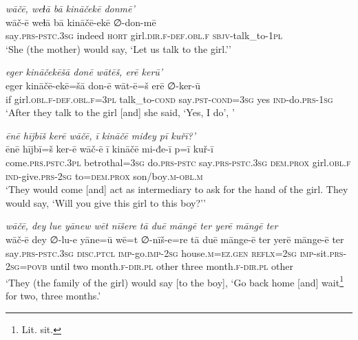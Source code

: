 \ea \label{ŽE.76}
\textit{wāčē, weɫā bā kināčekē donmē’} \\ 
\gll wāč-ē weɫā bā kināčē-ekē ∅-don-mē \\ 
 say\textsc{.prs-pstc}\textsc{.3sg} indeed \textsc{hort} girl\textsc{.dir}\textsc{.f}\textsc{-def}\textsc{.obl}\textsc{.f} \textsc{sbjv-}talk\_to\textsc{-1pl} \\ 
\glt `She (the mother) would say, ‘Let us talk to the girl.’'
\z 
 
\ea \label{ŽE.77}
\textit{eger kināčekēšā donē wātēš, erē kerū’} \\ 
\gll eger kināčē-ekē=šā don-ē wāt-ē=š erē ∅-ker-ū \\ 
 if girl\textsc{.obl}\textsc{.f}\textsc{-def}\textsc{.obl}\textsc{.f}\textsc{=3pl} talk\_to\textsc{-cond} say\textsc{.pst}\textsc{-cond}\textsc{=3sg} yes \textsc{ind-}do\textsc{.prs}\textsc{-\textsc{1sg}} \\ 
\glt `After they talk to the girl [and] she said, ‘Yes, I do’, '
\z 
 
\ea \label{ŽE.80}
\textit{ēnē hījbīš kerē wāčē, ī kināčē miđey pī kuřī?’} \\ 
\gll ēnē hījbī=š ker-ē wāč-ē ī kināčē mi-đe-ī p=ī kuř-ī \\ 
 come\textsc{.prs}\textsc{.pstc}\textsc{.3pl} betrothal\textsc{=3sg} do\textsc{.prs}\textsc{-pstc} say\textsc{.prs-pstc}\textsc{.3sg} \textsc{dem.prox} girl\textsc{.obl}\textsc{.f} \textsc{ind-}give\textsc{.prs}-\textsc{2sg} to=\textsc{dem.prox} son/boy\textsc{.m}\textsc{-obl}\textsc{.m} \\ 
\glt `They would come [and] act as intermediary to ask for the hand of the girl. They would say, ‘Will you give this girl to this boy?’'
\z 
 
\ea \label{ŽE.82}
\textit{wāčē, dey lue yānew wēt nīšere tā duē māngē ter yerē māngē ter} \\ 
\gll wāč-ē dey ∅-lu-e yāne=ū wē=t ∅-nīš-e=re tā duē mānge-ē ter yerē mānge-ē ter \\ 
 say\textsc{.prs-pstc}\textsc{.3sg} \textsc{disc}.\textsc{ptcl} \textsc{imp-}go.\textsc{imp-}\textsc{2sg} house\textsc{.m}\textsc{\textsc{=ez.gen}} \textsc{reflx}\textsc{=\textsc{2sg}} \textsc{imp-}sit\textsc{.prs}-\textsc{2sg}\textsc{=\textsc{povb}} until two month\textsc{.f}\textsc{-dir}\textsc{.pl} other three month\textsc{.f}\textsc{-dir}\textsc{.pl} other \\ 
\glt `They (the family of the girl) would say [to the boy], ‘Go back home [and] wait\footnote{Lit. sit.} for two, three months.'
\z 
 

